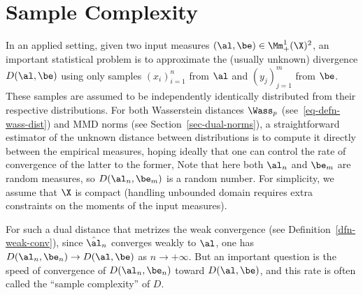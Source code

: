 \section{Sample Complexity}

In an applied setting, given two input measures $(\al,\be) \in \Mm_+^1(\X)^2$, an important statistical problem is to approximate the (usually unknown) divergence $D(\al,\be)$ using only samples $(x_i)_{i=1}^n$ from $\al$ and $(y_j)_{j=1}^m$ from $\be$. These samples are assumed to be independently identically distributed from their respective distributions.
%
For both Wasserstein distances $\Wass_p$ (see~\ref{eq-defn-wass-dist}) and MMD norms (see Section~\ref{sec-dual-norms}), a straightforward estimator of the unknown distance between distributions is to compute it directly between the empirical measures, hoping ideally that one can control the rate of convergence of the latter to the former,
Note that here both $\al_n$ and $\be_m$ are random measures, so $D(\al_n,\be_m)$ is a random number.
%
For simplicity, we assume that $\X$ is compact (handling unbounded domain requires extra constraints on the moments of the input measures).

For such a dual distance that metrizes the weak convergence (see Definition~\ref{dfn-weak-conv}), since $\hat\al_n$ converges weakly to $\al$, one has $D(\al_n,\be_n) \rightarrow D(\al,\be)$ as $n \rightarrow +\infty$.
%
But an important question is the speed of convergence of $D(\al_n,\be_n)$ toward $D(\al,\be)$, and this rate is often called the ``sample complexity'' of $D$.


